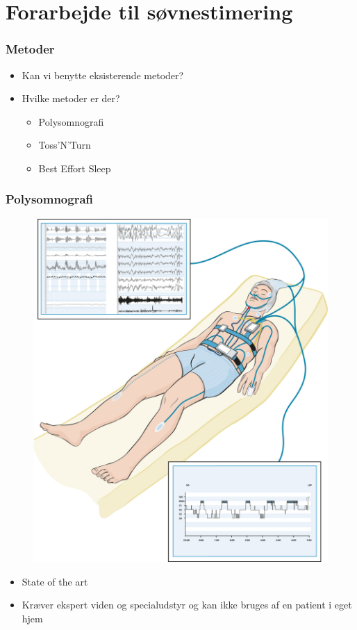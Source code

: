\section{Forarbejde til søvnestimering}
\begin{frame}
\frametitle{Metoder}
	\begin{itemize}
	\item Kan vi benytte eksisterende metoder?
	\item Hvilke metoder er der?
	{\begin{itemize}
		\item Polysomnografi
		\item Toss'N'Turn
		\item Best Effort Sleep
		 \end{itemize}}
	\end{itemize}
\end{frame}

\begin{frame}
\frametitle{Polysomnografi}
\begin{figure}
	\includegraphics[scale=0.05]{polysomnografi}
\end{figure}

\begin{itemize}
	\item State of the art
	\item Kræver ekspert viden og specialudstyr og kan ikke bruges af en patient i eget hjem
\end{itemize}
\end{frame}

